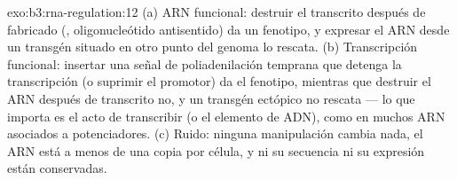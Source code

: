 \begin{solution}{exo:b3:rna-regulation:12}
(a) ARN funcional: destruir el transcrito después de fabricado (,
oligonucleótido antisentido) da un fenotipo, y expresar el ARN desde un
transgén situado en otro punto del genoma lo rescata. (b) Transcripción
funcional: insertar una señal de poliadenilación temprana que detenga la
transcripción (o suprimir el promotor) da el fenotipo, mientras que
destruir el ARN después de transcrito no, y un transgén ectópico no
rescata --- lo que importa es el acto de transcribir (o el elemento de
ADN), como en muchos ARN asociados a potenciadores. (c) Ruido: ninguna
manipulación cambia nada, el ARN está a menos de una copia por célula, y
ni su secuencia ni su expresión están conservadas.
\end{solution}

